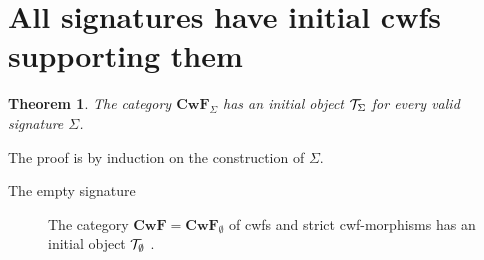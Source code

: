 \documentclass{lmcs}
\newtheorem{theorem}{Theorem}
\def\Cwf{\mathbf{CwF}}
\begin{document}
\section{All signatures have initial cwfs supporting them}

\begin{theorem}
The category $\Cwf_\Sigma$ has an initial object ${\mathcal T}_\Sigma$ for every valid signature $\Sigma$.
\end{theorem}

The proof is by induction on the construction of $\Sigma$.
\begin{description}
\item[The empty signature] 
The category $\Cwf = \Cwf_\emptyset$ of cwfs and strict cwf-morphisms has an initial object ${\mathcal T}_\emptyset$ \cite{castellan:tlca2015,castellan:lmcs}.
\end{description}
\end{document}
